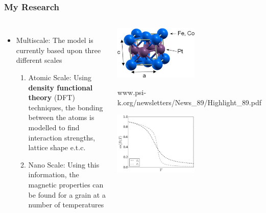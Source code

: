 \documentclass{beamer}
\begin{document}
\begin{frame}
	\frametitle{My Research}
	\begin{columns}
		\column{6cm}
		\begin{itemize}
			\item{Multiscale: The model is currently based upon three different scales}\newline
			\begin{enumerate}
				\item{Atomic Scale: Using \textbf{density functional theory} (DFT) techniques, the bonding between the atoms is modelled to find interaction strengths, lattice shape e.t.c.}\newline
				\item{Nano Scale: Using this information, the magnetic properties can be found for a grain at a number of temperatures}
			\end{enumerate}
		\end{itemize}
		\column{6cm}
		\begin{center}
			\includegraphics[width=4cm]{lattice.jpeg}\vspace{1mm}
			
			\tiny www.psi-k.org/newsletters/News{\_}89/Highlight{\_}89.pdf
		
			\includegraphics[width=4cm]{Ds_noinset.png}
		\end{center}
	\end{columns}
\end{frame}
\end{document}
